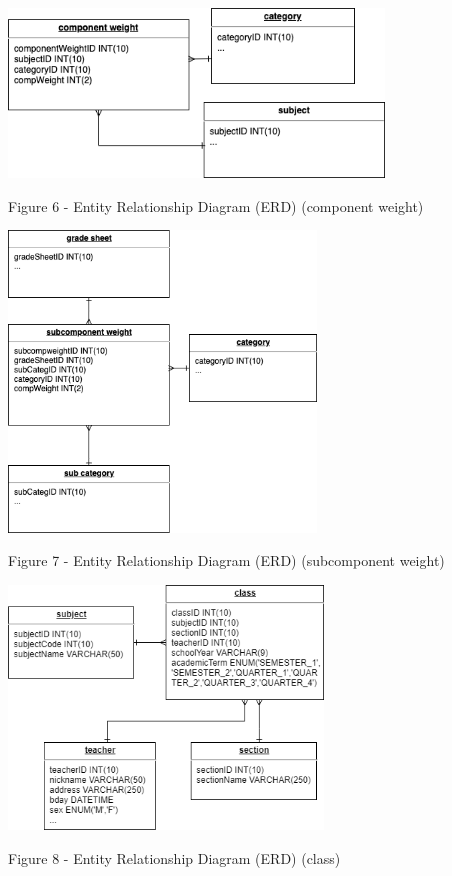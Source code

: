 \documentclass[11pt,a4paper,titlepage]{article}
\begin{document}
\vspace{1cm}
\begin{center}
    \includegraphics[height=4.5cm]{Component-Weight.png}
\end{center}
\vspace{1cm}
\begin{center}
    Figure 6 - Entity Relationship Diagram (ERD) (component weight)
\end{center}


\vspace{1cm}
\begin{center}
    \includegraphics[height=8.0cm]{Subcomponent-Weight.png}
\end{center}
\vspace{1cm}
\begin{center}
    Figure 7 - Entity Relationship Diagram (ERD) (subcomponent weight)
\end{center}

\vspace{1cm}
\begin{center}
    \includegraphics[height=6.5cm]{Class.png}
\end{center}
\vspace{1cm}
\begin{center}
    Figure 8 - Entity Relationship Diagram (ERD) (class)
\end{center}
\end{document}
